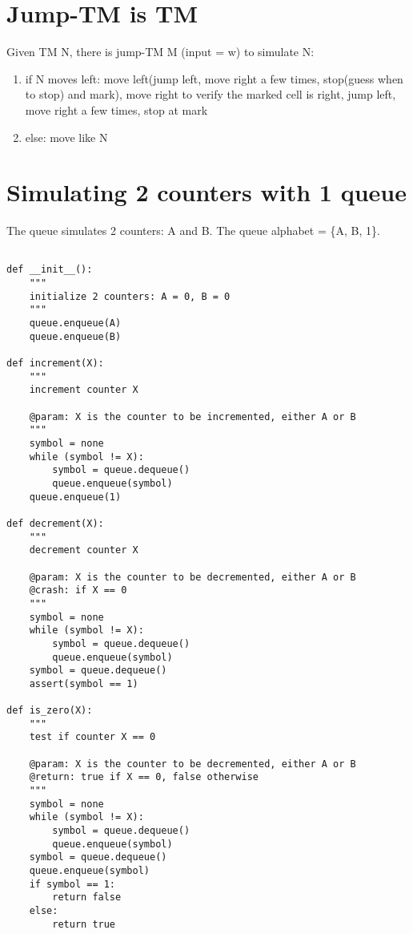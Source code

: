\documentclass{article}
\begin{document}
\section{Jump-TM is TM}
Given TM N, there is jump-TM M (input = w) to simulate N:
\begin{enumerate}
	\item if N moves left: move left(jump left, move right a few times, stop(guess when to stop) and mark), move right to verify the marked cell is right, jump left, move right a few times, stop at mark
	\item else: move like N
\end{enumerate}

\section{Simulating 2 counters with 1 queue}
The queue simulates 2 counters: A and B. The queue alphabet = \{A, B, 1\}.
\begin{lstlisting}

def __init__():
	"""
	initialize 2 counters: A = 0, B = 0
	"""
	queue.enqueue(A)
	queue.enqueue(B)
	
def increment(X):
	"""
	increment counter X
	
	@param: X is the counter to be incremented, either A or B
	"""
	symbol = none
	while (symbol != X):
		symbol = queue.dequeue()
		queue.enqueue(symbol)
	queue.enqueue(1)

def decrement(X):
	"""
	decrement counter X
	
	@param: X is the counter to be decremented, either A or B
	@crash: if X == 0
	"""
	symbol = none
	while (symbol != X):
		symbol = queue.dequeue()
		queue.enqueue(symbol)
	symbol = queue.dequeue()
	assert(symbol == 1)
	
def is_zero(X):
	"""
	test if counter X == 0
	
	@param: X is the counter to be decremented, either A or B
	@return: true if X == 0, false otherwise
	"""
	symbol = none
	while (symbol != X):
		symbol = queue.dequeue()
		queue.enqueue(symbol)
	symbol = queue.dequeue()	
	queue.enqueue(symbol)
	if symbol == 1:
		return false
	else:
		return true
	
\end{lstlisting}
\end{document}
